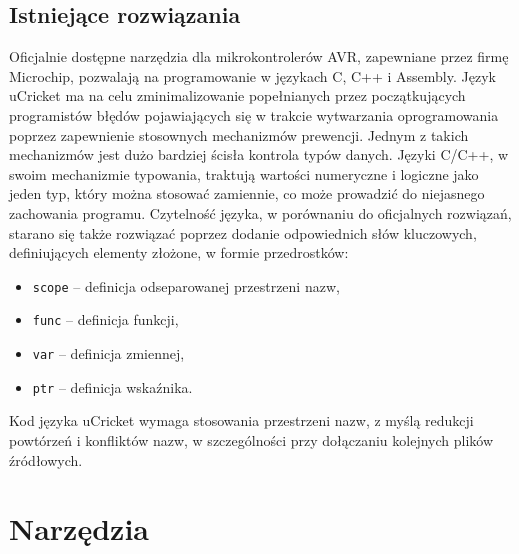 \subsection{Istniejące rozwiązania}
Oficjalnie dostępne narzędzia dla mikrokontrolerów AVR, zapewniane przez firmę Microchip, pozwalają na programowanie w językach C, C++ i Assembly. Język uCricket ma na celu zminimalizowanie popełnianych przez początkujących programistów błędów pojawiających się w trakcie wytwarzania oprogramowania poprzez zapewnienie stosownych mechanizmów prewencji. Jednym z takich mechanizmów jest dużo bardziej ścisła kontrola typów danych. Języki C/C++, w swoim  mechanizmie typowania, traktują wartości numeryczne i logiczne jako jeden typ, który można stosować zamiennie, co może prowadzić do niejasnego zachowania programu. 
Czytelność języka, w porównaniu do oficjalnych rozwiązań, starano się także rozwiązać poprzez dodanie odpowiednich słów kluczowych, definiujących elementy złożone, w formie przedrostków:
\begin{itemize}
\item \lstinline|scope| -- definicja odseparowanej przestrzeni nazw,
\item \lstinline|func| -- definicja funkcji,
\item \lstinline|var| -- definicja zmiennej,
\item \lstinline|ptr| -- definicja wskaźnika.
\end{itemize}
Kod języka uCricket wymaga stosowania przestrzeni nazw, z myślą redukcji powtórzeń i konfliktów nazw, w szczególności przy dołączaniu kolejnych plików źródłowych.


\section{Narzędzia}

